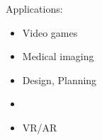 
Applications:
\begin{itemize}
    \item Video games
    \item Medical imaging
    \item Design, Planning
    \item
    \item VR/AR
\end{itemize}
